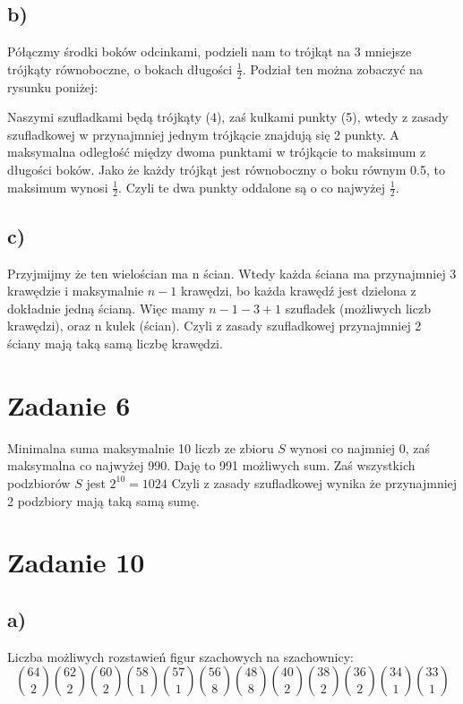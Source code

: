 \documentclass{article}
\begin{document}
\subsection*{b) }
Półączmy środki boków odcinkami, podzieli nam to trójkąt na 3 mniejsze trójkąty równoboczne, o bokach długości $\frac{1}{2}$. Podział ten można zobaczyć na rysunku poniżej:
\begin{center}
\end{center}
Naszymi szufladkami będą trójkąty (4), zaś kulkami punkty (5), wtedy z zasady szufladkowej w przynajmniej jednym trójkącie znajdują się 2 punkty. A maksymalna odległość między dwoma punktami w trójkącie to maksimum z długości boków. Jako że każdy trójkąt jest równoboczny o boku równym 0.5, to maksimum wynosi $\frac{1}{2}$. Czyli  te dwa punkty oddalone są o co najwyżej $\frac{1}{2}$.
\subsection*{c)}
Przyjmijmy że ten wielościan ma n ścian. Wtedy każda ściana ma przynajmniej 3 krawędzie i maksymalnie $n-1$ krawędzi, bo każda krawędź jest dzielona z dokładnie jedną ścianą. Więc mamy $n-1-3+1$ szufladek (możliwych liczb krawędzi), oraz n kulek (ścian). Czyli z zasady szufladkowej przynajmniej 2 ściany mają taką samą liczbę krawędzi.

\section*{Zadanie 6}
Minimalna suma maksymalnie 10 liczb ze zbioru $S$ wynosi co najmniej 0, zaś maksymalna co najwyżej 990. Daję to 991
możliwych sum. Zaś wszystkich podzbiorów $S$ jest $2^{10} = 1024$ Czyli z zasady szufladkowej wynika że przynajmniej 2 podzbiory mają taką samą sumę. 

\section*{Zadanie 10}
\subsection*{a)}
Liczba możliwych rozstawień figur szachowych na szachownicy:
\[ {64 \choose 2} {62 \choose 2} {60 \choose 2} {58 \choose 1} {57 \choose 1} {56 \choose 8} {48 \choose 8} {40 \choose 2} {38 \choose 2} {36 \choose 2} {34 \choose 1} {33 \choose 1}\]
\end{document}
